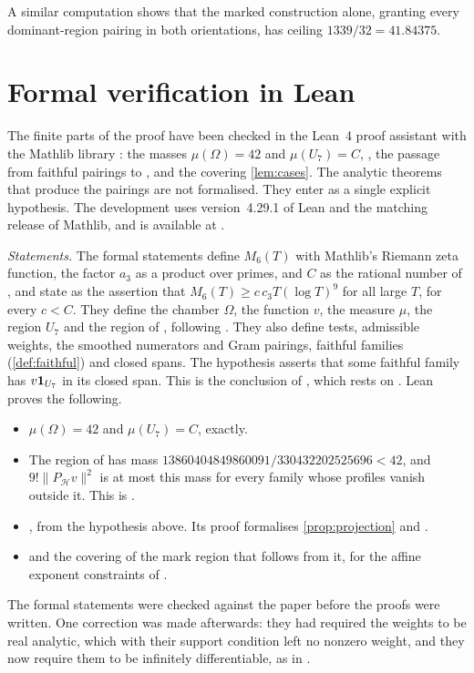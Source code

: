 \documentclass[11pt,colorlinks]{charlie}
\newcommand{\Om}{\Omega}
\begin{document}
\begin{remark}
A similar computation shows that the marked construction alone, granting every dominant-region pairing in both orientations, has ceiling $1339/32=41.84375$.
\end{remark}

\section{Formal verification in Lean}\label{sec:lean}
The finite parts of the proof have been checked in the Lean~4 proof assistant \cite{Lean4} with the Mathlib library \cite{Mathlib}: the masses $\mu(\Om)=42$ and $\mu(U_7)=C$, , the passage from faithful pairings to , and the covering \cref{lem:cases}. The analytic theorems that produce the pairings are not formalised. They enter as a single explicit hypothesis. The development uses version~4.29.1 of Lean and the matching release of Mathlib, and is available at \coderepo.

\emph{Statements.} The formal statements define $M_6(T)$ with Mathlib's Riemann zeta function, the factor $a_3$ as a product over primes, and $C$ as the rational number of , and state  as the assertion that $M_6(T)\ge c\,c_3T(\log T)^9$ for all large $T$, for every $c<C$. They define the chamber $\Om$, the function $v$, the measure $\mu$, the region $U_7$ and the region of , following . They also define tests, admissible weights, the smoothed numerators and Gram pairings, faithful families (\cref{def:faithful}) and closed spans. The hypothesis asserts that some faithful family has $v\mathbf{1}_{U_7}$ in its closed span. This is the conclusion of , which rests on . Lean proves the following.
\begin{itemize}\small
\item $\mu(\Om)=42$ and $\mu(U_7)=C$, exactly.
\item The region of  has mass $13860404849860091/330432202525696<42$, and $9!\|P_{\mathcal H}v\|^2$ is at most this mass for every family whose profiles vanish outside it. This is .
\item {}, from the hypothesis above. Its proof formalises \cref{prop:projection} and .
\item {} and the covering of the mark region that follows from it, for the affine exponent constraints of .
\end{itemize}
The formal statements were checked against the paper before the proofs were written. One correction was made afterwards: they had required the weights to be real analytic, which with their support condition left no nonzero weight, and they now require them to be infinitely differentiable, as in .
\end{document}
